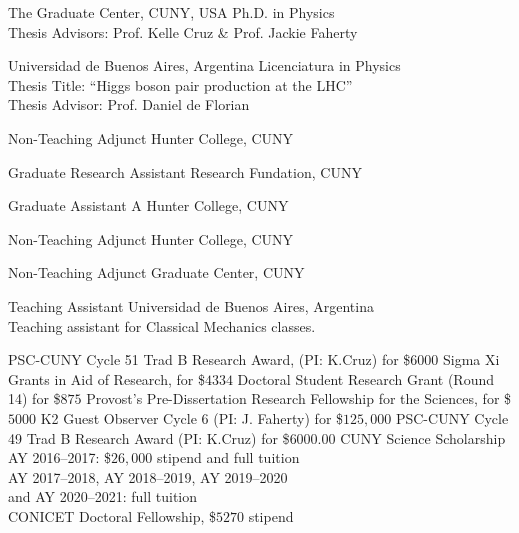 \documentclass[10pt]{cv}
\newcommand\tab[1][1cm]{\hspace*{#1}}
\begin{document}
\begin{llist}

The Graduate Center, CUNY, USA
Ph.D. in Physics\\
Thesis Advisors: Prof. Kelle Cruz \& Prof. Jackie Faherty

Universidad de Buenos Aires, Argentina
Licenciatura in Physics\\
Thesis Title: ``Higgs boson pair production at the LHC''\\
Thesis Advisor: Prof. Daniel de Florian


Non-Teaching Adjunct
Hunter College, CUNY

Graduate Research Assistant
Research Fundation, CUNY

Graduate Assistant A
Hunter College, CUNY

Non-Teaching Adjunct
Hunter College, CUNY

Non-Teaching Adjunct
Graduate Center, CUNY

Teaching Assistant
Universidad de Buenos Aires, Argentina\\
Teaching assistant for Classical Mechanics classes.



PSC-CUNY Cycle 51 Trad B Research Award, (PI: K.Cruz) for \$$6000$
Sigma Xi Grants in Aid of Research, for \$$4334$
Doctoral Student Research Grant (Round 14) for \$$875$    
Provost’s Pre-Dissertation Research Fellowship for the Sciences, for \$$5000$
K2 Guest Observer Cycle 6 (PI: J. Faherty) for \$$125,000$
PSC-CUNY Cycle 49 Trad B Research Award (PI: K.Cruz) for \$$6000.00$
CUNY Science Scholarship
\tab AY 2016–2017: \$$26,000$ stipend and full tuition\\
\tab AY 2017–2018, AY 2018–2019, AY 2019–2020\\ 
\tab and AY 2020–2021: full tuition\\
CONICET Doctoral Fellowship, \$$5270$ stipend



\end{llist}
\end{document}
